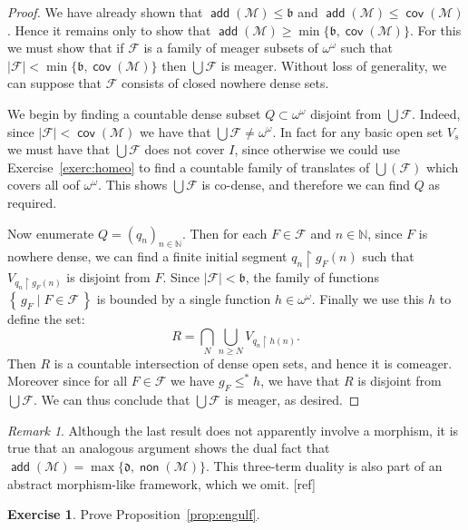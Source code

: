 \documentclass[11pt,oneside]{amsbook}
\newcommand{\set}[1]{\left\{\,#1\,\right\}}
\newcommand{\NN}{\mathbb N}
\newcommand{\Meager}{\mathcal M}
\DeclareMathOperator{\add}{\mathsf{add}}
\DeclareMathOperator{\non}{\mathsf{non}}
\DeclareMathOperator{\cov}{\mathsf{cov}}
\theoremstyle{definition}
\newtheorem{exerc}{Exercise}[section]
\theoremstyle{plain}
\theoremstyle{definition}
\theoremstyle{remark}
\newtheorem{rem}[thm]{Remark}
\begin{document}
\begin{proof}
  We have already shown that $\add(\Meager)\leq\mathfrak b$ and $\add(\Meager)\leq\cov(\Meager)$. Hence it remains only to show that $\add(\Meager)\geq\min\{\mathfrak b,\cov(\Meager)\}$. For this we must show that if $\mathcal F$ is a family of meager subsets of $\omega^\omega$ such that $|\mathcal F|<\min\{\mathfrak b,\cov(\Meager)\}$ then $\bigcup\mathcal F$ is meager. Without loss of generality, we can suppose that $\mathcal F$ consists of closed nowhere dense sets.

  We begin by finding a countable dense subset $Q\subset\omega^\omega$ disjoint from $\bigcup\mathcal F$. Indeed, since $|\mathcal F|<\cov(\Meager)$ we have that $\bigcup\mathcal F\neq\omega^\omega$. In fact for any basic open set $V_s$ we must have that $\bigcup\mathcal F$ does not cover $I$, since otherwise we could use Exercise~\ref{exerc:homeo} to find a countable family of translates of $\bigcup(\mathcal F)$ which covers all oof $\omega^\omega$. This shows $\bigcup\mathcal F$ is co-dense, and therefore we can find $Q$ as required.

  Now enumerate $Q=(q_n)_{n\in\NN}$. Then for each $F\in\mathcal F$ and $n\in\NN$, since $F$ is nowhere dense, we can find a finite initial segment $q_n\restriction g_F(n)$ such that $V_{q_n\restriction g_F(n)}$ is disjoint from $F$. Since $|\mathcal F|<\mathfrak b$, the family of functions $\set{g_F\mid F\in\mathcal F}$ is bounded by a single function $h\in\omega^\omega$. Finally we use this $h$ to define the set:
  \[R=\bigcap_N\bigcup_{n\geq N}V_{q_n\restriction h(n)}\text{.}
  \]
  Then $R$ is a countable intersection of dense open sets, and hence it is comeager. Moreover since for all $F\in\mathcal F$ we have $g_F\leq^*h$, we have that $R$ is disjoint from $\bigcup\mathcal F$. We can thus conclude that $\bigcup\mathcal F$ is meager, as desired.
\end{proof}

\begin{rem}
  Although the last result does not apparently involve a morphism, it is true that an analogous argument shows the dual fact that $\add(\Meager)=\max\{\mathfrak d,\non(\Meager)\}$. This three-term duality is also part of an abstract morphism-like framework, which we omit. [ref]
\end{rem}

\begin{exerc}
  \label{exerc:engulf}
  Prove Proposition~\ref{prop:engulf}.
\end{exerc}
\end{document}
